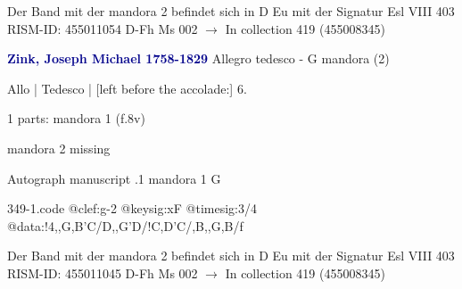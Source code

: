 \documentclass[twocolumn]{book}
\begin{document}
\newline Der Band mit der mandora 2 befindet sich in D Eu mit der Signatur Esl VIII 403
\newline RISM-ID: 455011054
\newline D-Fh  Ms 002
\newline $\rightarrow$ In collection 419 (455008345)
      
\newline \par \vspace{7pt} \textcolor{darkblue}{\textbf{Zink, Joseph Michael  1758-1829}}
\newline Allegro tedesco - G
\newline mandora (2)
\newline \begin{itshape}[f.8v, at left:] Allo | Tedesco | [left before the accolade:] 6.\end{itshape} 
\newline \textcolor{darkblue}{}  1 parts: mandora 1  (f.8v)
\newline \begin{small} mandora 2 missing\end{small} 
\newline Autograph manuscript
.1  mandora 1  G  
\begin{filecontents*}{349-1.code}
@clef:g-2
@keysig:xF
@timesig:3/4
@data:!4,,G,B'C/D,,G'D/!C,D'C/,B,,G,B/f
\end{filecontents*}
\newline
%

\newline Der Band mit der mandora 2 befindet sich in D Eu mit der Signatur Esl VIII 403
\newline RISM-ID: 455011045
\newline D-Fh  Ms 002
\newline $\rightarrow$ In collection 419 (455008345)
      
\end{document}

